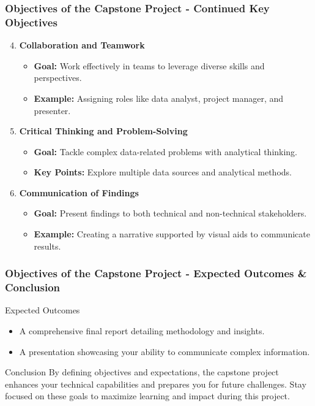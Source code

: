 \documentclass[aspectratio=169]{beamer}
\begin{document}
\begin{frame}[fragile]
    \frametitle{Objectives of the Capstone Project - Continued Key Objectives}
    \begin{enumerate}
        \setcounter{enumi}{3} %
        \item \textbf{Collaboration and Teamwork}
        \begin{itemize}
            \item \textbf{Goal:} Work effectively in teams to leverage diverse skills and perspectives.
            \item \textbf{Example:} Assigning roles like data analyst, project manager, and presenter.
        \end{itemize}

        \item \textbf{Critical Thinking and Problem-Solving}
        \begin{itemize}
            \item \textbf{Goal:} Tackle complex data-related problems with analytical thinking.
            \item \textbf{Key Points:} Explore multiple data sources and analytical methods.
        \end{itemize}

        \item \textbf{Communication of Findings}
        \begin{itemize}
            \item \textbf{Goal:} Present findings to both technical and non-technical stakeholders.
            \item \textbf{Example:} Creating a narrative supported by visual aids to communicate results.
        \end{itemize}
    \end{enumerate}
\end{frame}

\begin{frame}[fragile]
    \frametitle{Objectives of the Capstone Project - Expected Outcomes & Conclusion}
    \begin{block}{Expected Outcomes}
        \begin{itemize}
            \item A comprehensive final report detailing methodology and insights.
            \item A presentation showcasing your ability to communicate complex information.
        \end{itemize}
    \end{block}

    \begin{block}{Conclusion}
        By defining objectives and expectations, the capstone project enhances your technical capabilities and prepares you for future challenges. 
        Stay focused on these goals to maximize learning and impact during this project.
    \end{block}
\end{frame}
\end{document}
